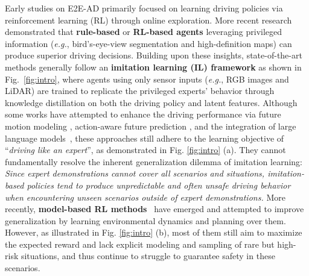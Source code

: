 \documentclass[twocolumn]{template}
\theoremstyle{thmstyleone}%
\theoremstyle{thmstyletwo}%
\theoremstyle{thmstylethree}%
\begin{document}
Early studies on E2E-AD \cite{MaRLn,WoR,GRIAD} primarily focused on learning driving policies via reinforcement learning (RL) through online exploration. More recent research \cite{Roach,LAV} demonstrated that \textbf{rule-based} or \textbf{RL-based agents} leveraging privileged information (\emph{e.g.}, bird’s-eye-view segmentation and high-definition maps) can produce superior driving decisions. Building upon these insights, state-of-the-art methods \cite{Reasonnet,InterFuser,TCP,ThinkTwice,CaT} generally follow an \textbf{imitation learning (IL) framework} as shown in Fig.~\ref{fig:intro}, where agents using only sensor inputs (\emph{e.g.}, RGB images and LiDAR) are trained to replicate the privileged experts’ behavior through knowledge distillation on both the driving policy and latent features.
Although some works have attempted to enhance the driving performance via future motion modeling \cite{Reasonnet,InterFuser,PlanT,Hip_ad}, action-aware future prediction \cite{MILE,ThinkTwice,LAW,WoTE}, and the
integration of large language models~\cite{Eta,VLR-Drive,Orion,Simlingo},
these approaches still adhere to the learning objective of “\textit{driving like an expert}”, as demonstrated in Fig. \ref{fig:intro} (a).
They cannot fundamentally resolve the inherent generalization dilemma of imitation learning:
\textit{Since expert demonstrations cannot cover all scenarios and situations,
imitation-based policies tend to produce unpredictable and often unsafe driving behavior when encountering unseen scenarios outside of expert demonstrations.}
More recently, \textbf{model-based RL methods}~\cite{Think2drive,Raw2Drive} have emerged and attempted to improve generalization by learning environmental dynamics and planning over them.
However, as illustrated in Fig. \ref{fig:intro} (b),
most of them still aim to maximize the expected reward and lack explicit modeling and sampling of rare but high-risk situations,
and thus continue to struggle to guarantee safety in these scenarios.
\end{document}

